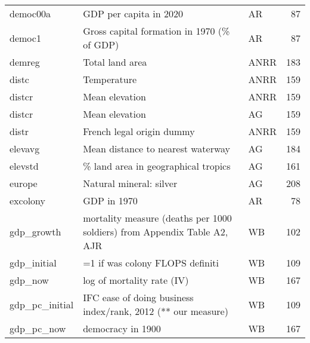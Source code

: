 \begin{tabular}{lllr}
democ00a                       &                                                    GDP per capita in 2020 &     AR &    87 \\
democ1                         &                                Gross capital formation in 1970 (\% of GDP) &     AR &    87 \\
demreg                         &                                                           Total land area &   ANRR &   183 \\
distc                          &                                                               Temperature &   ANRR &   159 \\
distcr                         &                                                            Mean elevation &   ANRR &   159 \\
distcr                         &                                                            Mean elevation &     AG &   159 \\
distr                          &                                                 French legal origin dummy &   ANRR &   159 \\
elevavg                        &                                         Mean distance to nearest waterway &     AG &   184 \\
elevstd                        &                                       \% land area in geographical tropics &     AG &   161 \\
europe                         &                                                   Natural mineral: silver &     AG &   208 \\
excolony                       &                                                               GDP in 1970 &     AR &    78 \\
gdp\_growth                     &  mortality measure (deaths per 1000 soldiers) from Appendix Table A2, AJR &     WB &   102 \\
gdp\_initial                    &                                           =1 if was colony FLOPS definiti &     WB &   109 \\
gdp\_now                        &                                                log of mortality rate (IV) &     WB &   167 \\
gdp\_pc\_initial                 &              IFC ease of doing business index/rank, 2012 (** our measure) &     WB &   109 \\
gdp\_pc\_now                     &                                                         democracy in 1900 &     WB &   167 \\

\end{tabular}
